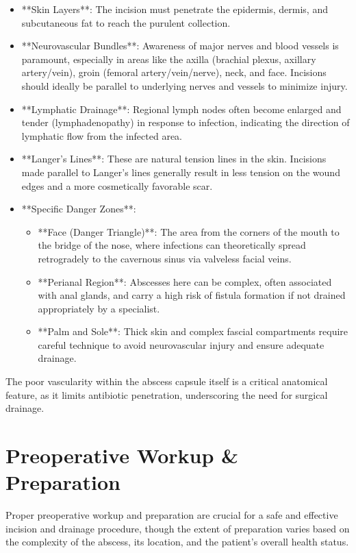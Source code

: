 \begin{itemize}
  \item **Skin Layers**: The incision must penetrate the epidermis, dermis, and subcutaneous fat to reach the purulent collection.
  \item **Neurovascular Bundles**: Awareness of major nerves and blood vessels is paramount, especially in areas like the axilla (brachial plexus, axillary artery/vein), groin (femoral artery/vein/nerve), neck, and face. Incisions should ideally be parallel to underlying nerves and vessels to minimize injury.
  \item **Lymphatic Drainage**: Regional lymph nodes often become enlarged and tender (lymphadenopathy) in response to infection, indicating the direction of lymphatic flow from the infected area.
  \item **Langer's Lines**: These are natural tension lines in the skin. Incisions made parallel to Langer's lines generally result in less tension on the wound edges and a more cosmetically favorable scar.
  \item **Specific Danger Zones**: 
    \begin{itemize}
      \item **Face (Danger Triangle)**: The area from the corners of the mouth to the bridge of the nose, where infections can theoretically spread retrogradely to the cavernous sinus via valveless facial veins.
      \item **Perianal Region**: Abscesses here can be complex, often associated with anal glands, and carry a high risk of fistula formation if not drained appropriately by a specialist.
      \item **Palm and Sole**: Thick skin and complex fascial compartments require careful technique to avoid neurovascular injury and ensure adequate drainage.
    \end{itemize}
\end{itemize}

The poor vascularity within the abscess capsule itself is a critical anatomical feature, as it limits antibiotic penetration, underscoring the need for surgical drainage.

\section*{Preoperative Workup \& Preparation}
Proper preoperative workup and preparation are crucial for a safe and effective incision and drainage procedure, though the extent of preparation varies based on the complexity of the abscess, its location, and the patient's overall health status.

